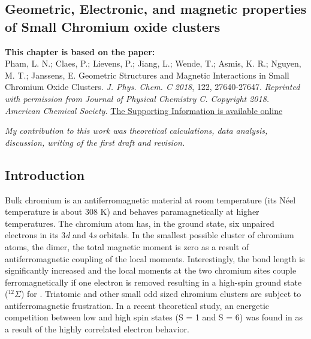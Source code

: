 
\begin{refsection}

\chapter[Small chromium oxide clusters]{Geometric, Electronic, and magnetic properties of Small Chromium oxide clusters} \label{CrxOy}


\begin{shaded}
\textbf{This chapter is based on the paper:}\\
Pham, L. N.; Claes, P.; Lievens, P.; Jiang, L.; Wende, T.; Asmis, K. R.; Nguyen, M. T.; Janssens, E. Geometric Structures and Magnetic Interactions in Small Chromium Oxide Clusters. \textit{J. Phys. Chem. C} \textit{2018}, 122, 27640-27647. \textit{Reprinted with permission from Journal of Physical Chemistry C. Copyright 2018. American Chemical Society.} \textcolor{blue}{\href{https://pubs.acs.org/doi/suppl/10.1021/acs.jpcc.8b10035/suppl_file/jp8b10035_si_002.pdf}{The Supporting Information is available online}}

\emph{My contribution to this work was theoretical calculations, data analysis, discussion, writing of the first draft and revision.}
\newpage
\end{shaded}


\section{Introduction}

Bulk chromium is an antiferromagnetic material at room temperature (its N\'{e}el temperature is about 308 K) and behaves paramagnetically at higher temperatures.\cite{Fawcett1988} The chromium atom has, in the ground state, six unpaired electrons in its 3\textit{d} and 4\textit{s} orbitals. In the smallest possible cluster of chromium atoms, the  dimer, the total magnetic moment is zero as a result of antiferromagnetic coupling of the local moments.\cite{bondybey1983, Riley1983, Zamudio2015} Interestingly, the  bond length is significantly increased and the local moments at the two chromium sites couple ferromagnetically if one electron is removed resulting in a high-spin ground state ($^{12}\Sigma$) for .\cite{Zamudio2015} Triatomic and other small odd sized chromium clusters are subject to antiferromagnetic frustration.\cite{Janssens2007,Cheng1996} In a recent theoretical study, an energetic competition between low and high spin states (S = 1 and S = 6) was found in  as a result of the highly correlated electron behavior.\cite{Estrada-Cr4}



\end{refsection}
